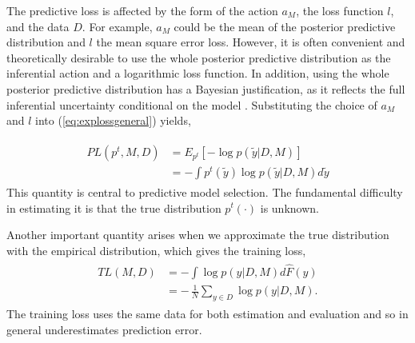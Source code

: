 \documentclass[sii]{ipart}
\begin{document}
The predictive loss is affected by the form of the 
action $a_M$, the loss function $l$, and the data $D$. For example, $a_M$ could
be the mean of the posterior predictive distribution and $l$ the mean square
error loss. However, it is often convenient and theoretically desirable to use
the whole posterior predictive distribution as the inferential action and a logarithmic loss function.  In addition, using the whole posterior predictive
distribution has a Bayesian justification, as it reflects the full inferential
uncertainty conditional on the model
\citep{Vehtari2012a}. Substituting the choice of $a_M$ and $l$ into
(\ref{eq:explossgeneral}) yields,

\begin{align}
  \begin{split}
  \label{eq:logloss}
  PL(p^t, M, D)&=E_{p^t}[-\log p(\tilde y|D, M)]\\ 
  &=-\int p^t(\tilde y) \log p(\tilde y|D, M) d\tilde y
  \end{split}
\end{align}
This quantity is central to predictive model selection. The
fundamental difficulty in estimating it is that the true distribution
$p^t(\cdot)$ is unknown.

Another important quantity arises when we approximate
the true distribution with the empirical distribution, which gives the training loss,
\begin{align}
  \begin{split}
  \label{eq:trloss}
  TL(M, D)&=-\int \log p(y|D, M) d\hat{F}(y)\\
  &=-\,\frac{1}{N}\sum_{y\in D}\log p(y | D, M).
  \end{split}
\end{align}
The training loss uses the same data for both estimation and evaluation and so in general underestimates prediction error.
\end{document}
